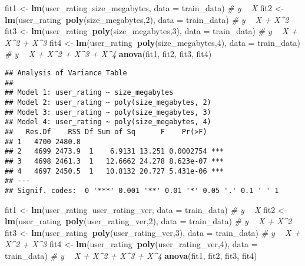 \documentclass[]{article}
\newenvironment{Shaded}{\begin{snugshade}}{\end{snugshade}}
\newcommand{\KeywordTok}[1]{\textcolor[rgb]{0.13,0.29,0.53}{\textbf{#1}}}
\newcommand{\DataTypeTok}[1]{\textcolor[rgb]{0.13,0.29,0.53}{#1}}
\newcommand{\DecValTok}[1]{\textcolor[rgb]{0.00,0.00,0.81}{#1}}
\newcommand{\StringTok}[1]{\textcolor[rgb]{0.31,0.60,0.02}{#1}}
\newcommand{\CommentTok}[1]{\textcolor[rgb]{0.56,0.35,0.01}{\textit{#1}}}
\newcommand{\OperatorTok}[1]{\textcolor[rgb]{0.81,0.36,0.00}{\textbf{#1}}}
\newcommand{\NormalTok}[1]{#1}
\begin{document}
\begin{Shaded}
\begin{Highlighting}[]
\NormalTok{fit1 <-}\StringTok{ }\KeywordTok{lm}\NormalTok{(user_rating}\OperatorTok{~}\NormalTok{size_megabytes, }\DataTypeTok{data =}\NormalTok{ train_data)  }\CommentTok{# y ~ X }
\NormalTok{fit2 <-}\StringTok{ }\KeywordTok{lm}\NormalTok{(user_rating}\OperatorTok{~}\KeywordTok{poly}\NormalTok{(size_megabytes,}\DecValTok{2}\NormalTok{), }\DataTypeTok{data =}\NormalTok{ train_data) }\CommentTok{# y ~ X + X^2}
\NormalTok{fit3 <-}\StringTok{ }\KeywordTok{lm}\NormalTok{(user_rating}\OperatorTok{~}\KeywordTok{poly}\NormalTok{(size_megabytes,}\DecValTok{3}\NormalTok{), }\DataTypeTok{data =}\NormalTok{ train_data) }\CommentTok{# y ~ X + X^2 + X^3}
\NormalTok{fit4 <-}\StringTok{ }\KeywordTok{lm}\NormalTok{(user_rating}\OperatorTok{~}\KeywordTok{poly}\NormalTok{(size_megabytes,}\DecValTok{4}\NormalTok{), }\DataTypeTok{data =}\NormalTok{ train_data) }\CommentTok{# y ~ X + X^2 + X^3 + X^4}
\KeywordTok{anova}\NormalTok{(fit1, fit2, fit3, fit4)}
\end{Highlighting}
\end{Shaded}

\begin{verbatim}
## Analysis of Variance Table
## 
## Model 1: user_rating ~ size_megabytes
## Model 2: user_rating ~ poly(size_megabytes, 2)
## Model 3: user_rating ~ poly(size_megabytes, 3)
## Model 4: user_rating ~ poly(size_megabytes, 4)
##   Res.Df    RSS Df Sum of Sq      F    Pr(>F)    
## 1   4700 2480.8                                  
## 2   4699 2473.9  1    6.9131 13.251 0.0002754 ***
## 3   4698 2461.3  1   12.6662 24.278 8.623e-07 ***
## 4   4697 2450.5  1   10.8132 20.727 5.431e-06 ***
## ---
## Signif. codes:  0 '***' 0.001 '**' 0.01 '*' 0.05 '.' 0.1 ' ' 1
\end{verbatim}

\begin{Shaded}
\begin{Highlighting}[]
\NormalTok{fit1 <-}\StringTok{ }\KeywordTok{lm}\NormalTok{(user_rating}\OperatorTok{~}\NormalTok{user_rating_ver, }\DataTypeTok{data =}\NormalTok{ train_data)  }\CommentTok{# y ~ X }
\NormalTok{fit2 <-}\StringTok{ }\KeywordTok{lm}\NormalTok{(user_rating}\OperatorTok{~}\KeywordTok{poly}\NormalTok{(user_rating_ver,}\DecValTok{2}\NormalTok{), }\DataTypeTok{data =}\NormalTok{ train_data) }\CommentTok{# y ~ X + X^2}
\NormalTok{fit3 <-}\StringTok{ }\KeywordTok{lm}\NormalTok{(user_rating}\OperatorTok{~}\KeywordTok{poly}\NormalTok{(user_rating_ver,}\DecValTok{3}\NormalTok{), }\DataTypeTok{data =}\NormalTok{ train_data) }\CommentTok{# y ~ X + X^2 + X^3}
\NormalTok{fit4 <-}\StringTok{ }\KeywordTok{lm}\NormalTok{(user_rating}\OperatorTok{~}\KeywordTok{poly}\NormalTok{(user_rating_ver,}\DecValTok{4}\NormalTok{), }\DataTypeTok{data =}\NormalTok{ train_data) }\CommentTok{# y ~ X + X^2 + X^3 + X^4}
\KeywordTok{anova}\NormalTok{(fit1, fit2, fit3, fit4)}
\end{Highlighting}
\end{Shaded}
\end{document}
